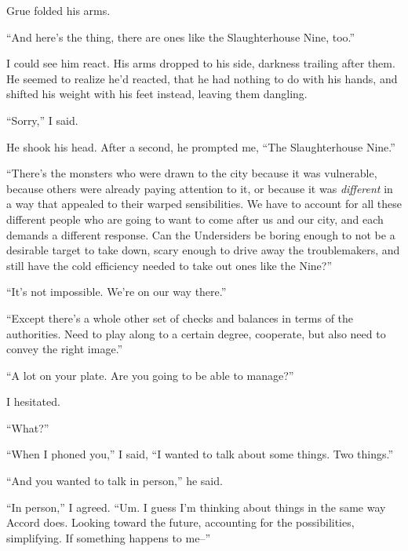 Grue folded his arms.



``And here's the thing, there are ones like the Slaughterhouse Nine, too.''



I could see him react.  His arms dropped to his side, darkness trailing after them.  He seemed to realize he'd reacted, that he had nothing to do with his hands, and shifted his weight with his feet instead, leaving them dangling.



``Sorry,'' I said.



He shook his head.  After a second, he prompted me, ``The Slaughterhouse Nine.''



``There's the monsters who were drawn to the city because it was vulnerable, because others were already paying attention to it, or because it was \emph{different} in a way that appealed to their warped sensibilities.  We have to account for all these different people who are going to want to come after us and our city, and each demands a different response.  Can the Undersiders be boring enough to not be a desirable target to take down, scary enough to drive away the troublemakers, and still have the cold efficiency needed to take out ones like the Nine?''



``It's not impossible.  We're on our way there.''



``Except there's a whole other set of checks and balances in terms of the authorities.  Need to play along to a certain degree, cooperate, but also need to convey the right image.''



``A lot on your plate.  Are you going to be able to manage?''



I hesitated.



``What?''



``When I phoned you,'' I said, ``I wanted to talk about some things.  Two things.''



``And you wanted to talk in person,'' he said.



``In person,'' I agreed.  ``Um.  I guess I'm thinking about things in the same way Accord does.  Looking toward the future, accounting for the possibilities, simplifying.  If something happens to me--''



